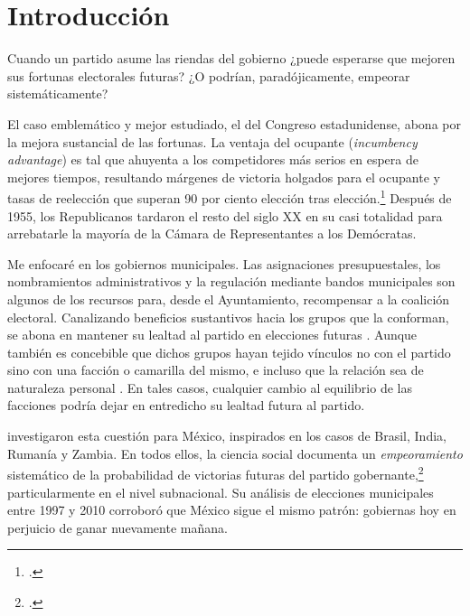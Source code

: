\documentclass[letter,12pt]{article}
\begin{document}
\newpage 

\onehalfspacing

\section{Introducción}

\noindent Cuando un partido asume las riendas del gobierno ¿puede esperarse que mejoren sus fortunas electorales futuras? ¿O podrían, paradójicamente, empeorar sistemáticamente?

El caso emblemático y mejor estudiado, el del Congreso estadunidense, abona por la mejora sustancial de las fortunas. La ventaja del ocupante (\emph{incumbency advantage}) es tal que ahuyenta a los competidores más serios en espera de mejores tiempos, resultando márgenes de victoria holgados para el ocupante y tasas de reelección que superan 90 por ciento elección tras elección.\footnote{\citet{erikson1971incumbency, mayhew1974vanishingMg, jacobson.1987.runningScared, cox.katz.1996, ansolabehere.snyder.IncAdv2002, gelman.king.1991incumbency}.} Después de 1955, los Republicanos tardaron el resto del siglo XX en su casi totalidad para arrebatarle la mayoría de la Cámara de Representantes a los Demócratas. 

Me enfocaré en los gobiernos municipales. Las asignaciones presupuestales, los nombramientos administrativos y la regulación mediante bandos municipales son algunos de los recursos para, desde el Ayuntamiento, recompensar a la coalición electoral. Canalizando beneficios sustantivos hacia los grupos que la conforman, se abona en mantener su lealtad al partido en elecciones futuras \citep{cox.mccubbins.1986, stokes.Argentina2005, diaz-estevez-magaloni-Poverty-book.2016}. Aunque también es concebible que dichos grupos hayan tejido vínculos no con el partido sino con una facción o camarilla del mismo, e incluso que la relación sea de naturaleza personal \citep{cain.etal.1987}. En tales casos, cualquier cambio al equilibrio de las facciones podría dejar en entredicho su lealtad futura al partido.

\citet{lucardi.rosas.Incumbency.2016} investigaron esta cuestión para México, inspirados en los casos de Brasil, India, Rumanía y Zambia. En todos ellos, la ciencia social documenta un \emph{empeoramiento} sistemático de la probabilidad de victorias futuras del partido gobernante,\footnote{\citet{brambor.ceneviva.BrasilReeleccionMunic.2012, klasnja.titiunik.IncumbCurse.2023, uppal.IncumbencyIndia.2009}.} particularmente en el nivel subnacional. Su análisis de elecciones municipales entre 1997 y 2010 corroboró que México sigue el mismo patrón: gobiernas hoy en perjuicio de ganar nuevamente mañana.
\end{document}
